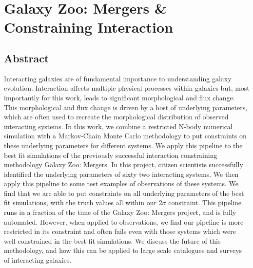 \chapter{Galaxy Zoo: Mergers \& Constraining Interaction}
\section{Abstract}
    Interacting galaxies are of fundamental importance to understanding galaxy evolution. Interaction affects multiple physical processes within galaxies but, most importantly for this work, leads to significant morphological and flux change. This morphological and flux change is driven by a host of underlying parameters, which are often used to recreate the morphological distribution of observed interacting systems. In this work, we combine a restricted N-body numerical simulation with a Markov-Chain Monte Carlo methodology to put constraints on these underlying parameters for different systems. We apply this pipeline to the best fit simulations of the previously successful interaction constraining methodology Galaxy Zoo: Mergers. In this project, citizen scientists successfully identified the underlying parameters of sixty two interacting systems. We then apply this pipeline to some test examples of observations of these systems. We find that we are able to put constraints on all underlying parameters of the best fit simulations, with the truth values all within our 2$\sigma$ constraint. This pipeline runs in a fraction of the time of the Galaxy Zoo: Mergers project, and is fully automated. However, when applied to observations, we find our pipeline is more restricted in its constraint and often fails even with those systems which were well constrained in the best fit simulations. We discuss the future of this methodology, and how this can be applied to large scale catalogues and surveys of interacting galaxies.


